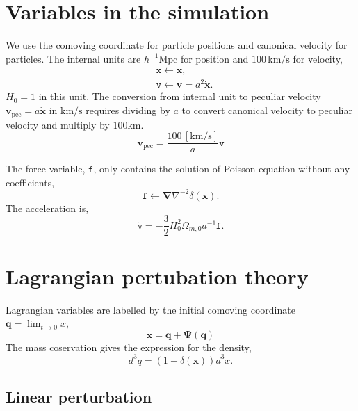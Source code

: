 \documentclass[a4paper]{article}
\begin{document}
\section{Variables in the simulation}
We use the comoving coordinate for particle positions and canonical
velocity for particles. The internal units are $h^{-1}
\mathrm{Mpc}$ for position and $100 \,\mathrm{km/s}$ for velocity, 
\begin{align}
  &\texttt{x} \leftarrow \bm{x},\\
  &\texttt{v} \leftarrow \bm{v} = a^2 \dot{\bm{x}}.
\end{align}
$H_0 = 1$ in this unit.
%
The conversion from internal unit to peculiar velocity
$\bm{v}_\mathrm{pec} = a \dot{\bm{x}}$ in $\mathrm{km}/\mathrm{s}$
requires dividing by $a$ to convert canonical velocity to peculiar
velocity and multiply by $100
\mathrm{km}$.
\begin{equation}
  \bm{v}_\mathrm{pec} = \frac{100 \,\mathrm{[km/s]}}{a} \texttt{v}
\end{equation}

The force variable, $\texttt{f}$, only contains the solution of Poisson
equation without any coefficients,
\begin{equation}
  \texttt{f} \leftarrow \bm{\nabla} \nabla^{-2} \delta(\bm{x}).
\end{equation}
The acceleration is,
\begin{equation}
  \dot{\texttt{v}} = -\frac{3}{2} H_0^2 \Omega_{m,0} a^{-1} \texttt{f}.
\end{equation}

\section{Lagrangian pertubation theory}
Lagrangian variables are labelled by the initial comoving coordinate $\bm{q} = \lim_{t \rightarrow 0} x$,
\begin{equation}
  \bm{x} = \bm{q} + \bm{\Psi}(\bm{q})
\end{equation}
The mass coservation gives the expression for the density,
\begin{equation}
  d^3 q = (1 + \delta(\bm{x})) d^3 x.
\end{equation}

\subsection{Linear perturbation}
\end{document}
